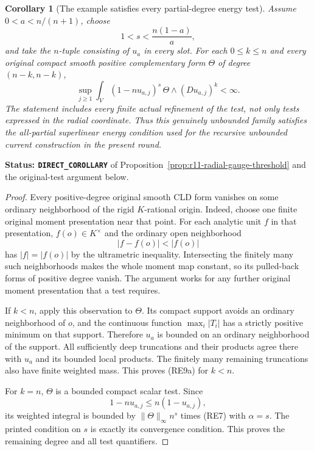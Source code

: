 \documentclass[11pt,a4paper]{article}
\numberwithin{equation}{section}
\newtheorem{corollary}[theorem]{Corollary}
\theoremstyle{definition}
\theoremstyle{remark}
\begin{document}
\begin{corollary}[The example satisfies every partial-degree energy test]
\label{cor:r11-radial-all-partial-energy}
Assume $0<a<n/(n+1)$, choose
\[
                    1<s<\frac{n(1-a)}a,
\]
and take the $n$-tuple consisting of $u_a$ in every slot.
For each $0\leq k\leq n$ and every original compact smooth
positive complementary form $\Theta$ of degree $(n-k,n-k)$,
\[
 \sup_{j\geq1}
 \int_V (1-nu_{a,j})^s\,
                    \Theta\wedge(Du_{a,j})^k<\infty.
 \tag{RE9a}
\]
The statement includes every finite actual refinement of the
test, not only tests expressed in the radial coordinate.
Thus this genuinely unbounded family satisfies the all-partial
superlinear energy condition used for the recursive unbounded
current construction in the present round.
\end{corollary}

\noindent\textbf{Status: \texttt{DIRECT\_COROLLARY}} of
Proposition~\ref{prop:r11-radial-gauge-threshold} and the
original-test argument below.

\begin{proof}
Every positive-degree original smooth CLD form vanishes on
some ordinary neighborhood of the rigid $K$-rational origin.
Indeed, choose one finite original moment presentation near
that point. For each analytic unit $f$ in that presentation,
$f(o)\in K^\times$ and the ordinary open neighborhood
\[
                 |f-f(o)|<|f(o)|
\]
has $|f|=|f(o)|$ by the ultrametric inequality. Intersecting
the finitely many such neighborhoods makes the whole moment
map constant, so its pulled-back forms of positive degree
vanish. The argument works for any further original moment
presentation that a test requires.

If $k<n$, apply this observation to $\Theta$. Its compact
support avoids an ordinary neighborhood of $o$, and the
continuous function $\max_i|T_i|$ has a strictly positive
minimum on that support. Therefore $u_a$ is bounded on an
ordinary neighborhood of the support. All sufficiently deep
truncations and their products agree there with $u_a$ and its
bounded local products. The finitely many remaining truncations
also have finite weighted mass. This proves (RE9a) for $k<n$.

For $k=n$, $\Theta$ is a bounded compact scalar test. Since
\[
              1-nu_{a,j}\leq n(1-u_{a,j}),
\]
its weighted integral is bounded by
$\|\Theta\|_\infty n^s$ times (RE7) with $\alpha=s$.
The printed condition on $s$ is exactly its convergence
condition. This proves the remaining degree and all test
quantifiers.
\end{proof}
\end{document}

